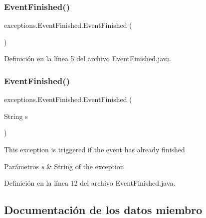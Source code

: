 \subsubsection{\texorpdfstring{EventFinished()}{EventFinished()}\hspace{0.1cm}{\footnotesize\ttfamily [1/2]}}
{\footnotesize\ttfamily exceptions.\+Event\+Finished.\+Event\+Finished (\begin{DoxyParamCaption}{ }\end{DoxyParamCaption})}



Definición en la línea 5 del archivo Event\+Finished.\+java.


\begin{DoxyCode}{0}

\end{DoxyCode}
\mbox{\label{classexceptions_1_1EventFinished_af9ee70ec7c85d6b2078618e86b61496b}} 
\subsubsection{\texorpdfstring{EventFinished()}{EventFinished()}\hspace{0.1cm}{\footnotesize\ttfamily [2/2]}}
{\footnotesize\ttfamily exceptions.\+Event\+Finished.\+Event\+Finished (\begin{DoxyParamCaption}\item[{String}]{s }\end{DoxyParamCaption})}

This exception is triggered if the event has already finished 
\begin{DoxyParams}{Parámetros}
{\em s} & String of the exception \\
\hline
\end{DoxyParams}


Definición en la línea 12 del archivo Event\+Finished.\+java.


\begin{DoxyCode}{0}

\end{DoxyCode}


\subsection{Documentación de los datos miembro}
\mbox{\label{classexceptions_1_1EventFinished_aa8201c32267eb18e31b7322fb020c5af}} 

